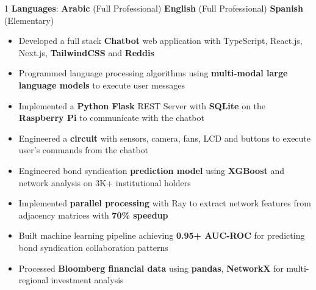 \documentclass[11pt,a4paper,ragged2e]{altacv}
\begin{document}
\begin{paracol}{1}
\textbf{Languages}:  \textbf{Arabic} (Full Professional) \hfill \textbf{English} (Full Professional) \hfill \textbf{Spanish} (Elementary)

\medskip

\begin{itemize}
  \item Developed a full stack \textbf{Chatbot} web application with TypeScript, React.js, Next.js, \textbf{TailwindCSS} and \textbf{Reddis}
  \item Programmed language processing algorithms using \textbf{multi-modal large language models} to execute user messages
  \item Implemented a \textbf{Python Flask} REST Server with \textbf{SQLite} on the \textbf{Raspberry Pi} to communicate with the chatbot
  \item Engineered a \textbf{circuit} with sensors, camera, fans, LCD and buttons to execute user's commands from the chatbot 
  \end{itemize}

  \medskip


\begin{itemize}
\item Engineered bond syndication \textbf{prediction model} using \textbf{XGBoost} and network analysis on 3K+ institutional holders
\item Implemented \textbf{parallel processing} with Ray to extract network features from adjacency matrices with \textbf{70\% speedup}
\item Built machine learning pipeline achieving \textbf{0.95+ AUC-ROC} for predicting bond syndication collaboration patterns
\item Processed \textbf{Bloomberg financial data} using \textbf{pandas}, \textbf{NetworkX} for multi-regional investment analysis
\end{itemize}
\tightdivider


\end{paracol}
\end{document}
